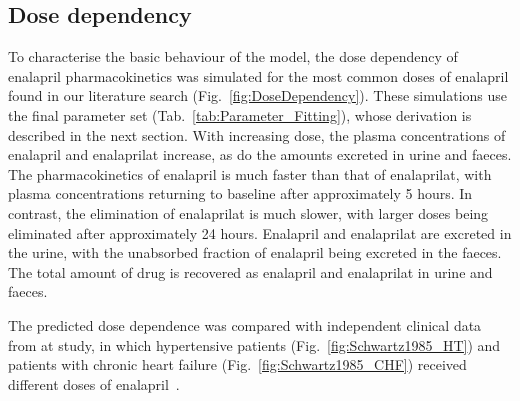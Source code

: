 \documentclass[pharmaceutics,article,submit,pdftex,moreauthors]{Definitions/mdpi}
\begin{document}

\subsection{Dose dependency}\label{sec:results_dose_dependency}

To characterise the basic behaviour of the model, the dose dependency of enalapril pharmacokinetics was simulated for the most common doses of enalapril found in our literature search (Fig.~\ref{fig:DoseDependency}). These simulations use the final parameter set (Tab.~\ref{tab:Parameter_Fitting}), whose derivation is described in the next section. With increasing dose, the plasma concentrations of enalapril and enalaprilat increase, as do the amounts excreted in urine and faeces. The pharmacokinetics of enalapril is much faster than that of enalaprilat, with plasma concentrations returning to baseline after approximately 5 hours. In contrast, the elimination of enalaprilat is much slower, with larger doses being eliminated after approximately 24 hours. Enalapril and enalaprilat are excreted in the urine, with the unabsorbed fraction of enalapril being excreted in the faeces. The total amount of drug is recovered as enalapril and enalaprilat in urine and faeces.


The predicted dose dependence was compared with independent clinical data from at study, in which hypertensive patients (Fig.~\ref{fig:Schwartz1985_HT}) and patients with chronic heart failure (Fig.~\ref{fig:Schwartz1985_CHF}) received different doses of enalapril~\cite{Schwartz1985}.


\end{document}
